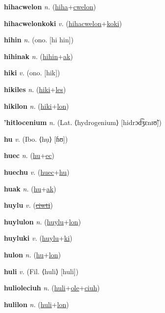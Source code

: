 \textbf{\hypertarget{hihacwelon}{hihacwelon}} \textit{n.} (\hyperlink{hiha}{hiha}+\allowbreak \hyperlink{cwelon}{cwelon})


\textbf{\hypertarget{hihacwelonkoki}{hihacwelonkoki}} \textit{v.} (\hyperlink{hihacwelon}{hihacwelon}+\allowbreak \hyperlink{koki}{koki})


\textbf{\hypertarget{hihin}{hihin}} \textit{n.} (ono. [hi hin])


\textbf{\hypertarget{hihinak}{hihinak}} \textit{n.} (\hyperlink{hihin}{hihin}+\allowbreak \hyperlink{ak}{ak})


\textbf{\hypertarget{hiki}{hiki}} \textit{v.} (ono. [hik])


\textbf{\hypertarget{hikiles}{hikiles}} \textit{n.} (\hyperlink{hiki}{hiki}+\allowbreak \hyperlink{les}{les})


\textbf{\hypertarget{hikilon}{hikilon}} \textit{n.} (\hyperlink{hiki}{hiki}+\allowbreak \hyperlink{lon}{lon})


\textbf{\hypertarget{'hitlocenium}{'hitlocenium}} \textit{n.} (Lat. ⟨hydrogenium⟩ [hidrɔd͡ʒɛnɪʊ̃])


\textbf{\hypertarget{hu}{hu}} \textit{v.} (Ibo. ⟨hụ⟩ [ɦʊ])


\textbf{\hypertarget{huec}{huec}} \textit{n.} (\hyperlink{hu}{hu}+\allowbreak \hyperlink{ec}{ec})


\textbf{\hypertarget{huechu}{huechu}} \textit{v.} (\hyperlink{huec}{huec}+\allowbreak \hyperlink{hu}{hu})


\textbf{\hypertarget{huak}{huak}} \textit{n.} (\hyperlink{hu}{hu}+\allowbreak \hyperlink{ak}{ak})


\textbf{\hypertarget{huylu}{huylu}} \textit{v.} (\hyperlink{ciwti}{\sout{ciwti}})


\textbf{\hypertarget{huylulon}{huylulon}} \textit{n.} (\hyperlink{huylu}{huylu}+\allowbreak \hyperlink{lon}{lon})


\textbf{\hypertarget{huyluki}{huyluki}} \textit{v.} (\hyperlink{huylu}{huylu}+\allowbreak \hyperlink{ki}{ki})


\textbf{\hypertarget{hulon}{hulon}} \textit{n.} (\hyperlink{hu}{hu}+\allowbreak \hyperlink{lon}{lon})


\textbf{\hypertarget{huli}{huli}} \textit{v.} (Fil. ⟨huli⟩ [huli])


\textbf{\hypertarget{hulioleciuh}{hulioleciuh}} \textit{n.} (\hyperlink{huli}{huli}+\allowbreak \hyperlink{ole}{ole}+\allowbreak \hyperlink{ciuh}{ciuh})


\textbf{\hypertarget{hulilon}{hulilon}} \textit{n.} (\hyperlink{huli}{huli}+\allowbreak \hyperlink{lon}{lon})


